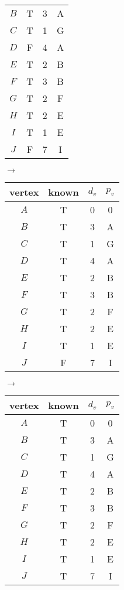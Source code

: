 \documentclass[12pt]{article}
\begin{document}
\begin{center}
\begin{tabular}{ c c c c }
$B$ & T & 3 & A \\
$C$ & T & 1 & G \\
$D$ & F & 4 & A \\
$E$ & T & 2 & B \\
$F$ & T & 3 & B \\
$G$ & T & 2 & F \\
$H$ & T & 2 & E \\
$I$ & T & 1 & E \\
$J$ & F & 7 & I \\
\end{tabular}
$\rightarrow$
\begin{tabular}{ c c c c } 
vertex & known & $d_v$ & $p_v$ \\
 \hline
$A$ & T & 0 & 0 \\
$B$ & T & 3 & A \\
$C$ & T & 1 & G \\
$D$ & T & 4 & A \\
$E$ & T & 2 & B \\
$F$ & T & 3 & B \\
$G$ & T & 2 & F \\
$H$ & T & 2 & E \\
$I$ & T & 1 & E \\
$J$ & F & 7 & I \\
\end{tabular}
$\rightarrow$
\begin{tabular}{ c c c c } 
vertex & known & $d_v$ & $p_v$ \\
 \hline
$A$ & T & 0 & 0 \\
$B$ & T & 3 & A \\
$C$ & T & 1 & G \\
$D$ & T & 4 & A \\
$E$ & T & 2 & B \\
$F$ & T & 3 & B \\
$G$ & T & 2 & F \\
$H$ & T & 2 & E \\
$I$ & T & 1 & E \\
$J$ & T & 7 & I \\
\end{tabular}

\end{center}

\newpage
\end{document}
